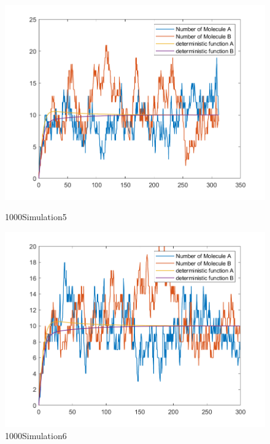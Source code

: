 \documentclass{article}
\begin{document}
\begin{figure}[htbp]
    \centering
    \begin{minipage}{0.45\linewidth}
        \centering
        \includegraphics[width=\linewidth]{graph/b5.png}
        \caption{1000Simulation5}
        \label{b5}
    \end{minipage}
    \hfill
    \begin{minipage}{0.45\linewidth}
        \centering
        \includegraphics[width=\linewidth]{graph/b6.png}
        \caption{1000Simulation6}
        \label{b6}
    \end{minipage}
\end{figure}

\clearpage
\end{document}
